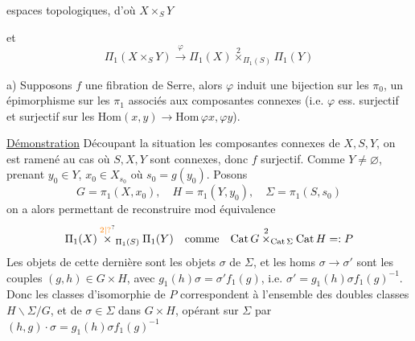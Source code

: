 espaces topologiques, d'où $X\times_S Y$

et
\[
\Pi_1(X\times_S Y)\xrightarrow{\varphi}
\Pi_1(X)\mathbin{\overset{2}{\times}}_{\Pi_1(S)}\Pi_1(Y)
\]

a) Supposons $f$ une fibration de Serre, alors $\varphi$ induit une bijection sur les $\pi_0$, un épimorphisme sur les $\pi_1$ associés aux composantes connexes (i.e. $\varphi$  ess. surjectif et surjectif sur les $\mathrm{Hom}(x,y)\to\mathrm{Hom}\,\varphi x,\varphi y$).

\uline{Démonstration} Découpant la situation  les composantes connexes de $X,S,Y$, on est ramené au cas où $S,X,Y$ sont connexes,  donc $f$ surjectif. Comme $Y\ne\varnothing$, prenant $y_0\in Y$, $x_0\in X_{s_0}$ où $s_0=g(y_0)$. Posons
\[
G=\pi_1(X,x_0),\quad H=\pi_1(Y,y_0),\quad \Sigma=\pi_1(S,s_0)
\]
on a alors
permettant de reconstruire mod équivalence
\[
\Pi_1(X)\mathbin{\overset{\unsure{2|?}}{\times}}_{\Pi_1(S)}\Pi_1(Y)
\quad\text{comme}\quad
\mathrm{Cat}\,G\mathbin{\overset{2}{\times}}_{\mathrm{Cat}\,\Sigma}\mathrm{Cat}\,H=:P
\]
Les objets de cette dernière sont les objets $\sigma$ de $\Sigma$, et les homs $\sigma\to\sigma'$ sont les couples $(g,h)\in G\times H$, avec $g_1(h)\sigma=\sigma'f_1(g)$, i.e. $\sigma'=g_1(h)\sigma f_1(g)^{-1}$. Donc les classes d'isomorphie de $P$ correspondent à l'ensemble des doubles classes $H\backslash\Sigma/G$, et     de $\sigma\in\Sigma$ dans $G\times H$, opérant sur $\Sigma$ par $(h,g)\cdot\sigma=g_1(h)\sigma f_1(g)^{-1}$
